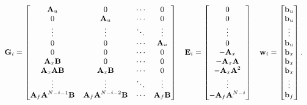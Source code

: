     \begin{equation}
    \begin{small}
        \begin{array}{rcl}
            \textbf{G}_i=\begin{bmatrix}
            \textbf{A}_u& 0& \cdots & 0\\
            0& \textbf{A}_u& \cdots & 0\\
            \vdots& \vdots& \ddots& \vdots\\
            0& 0& \cdots& \textbf{A}_u\\
            0& 0& \cdots& 0\\
            \textbf{A}_x\textbf{B}& 0& \cdots& 0\\
            \textbf{A}_x\textbf{A}\textbf{B}& \textbf{A}_x\textbf{B}& \cdots& 0\\
            \vdots& \vdots& \ddots& \vdots\\
            \textbf{A}_f\textbf{A}^{N-i-1}\textbf{B}& \textbf{A}_f\textbf{A}^{N-i-2}\textbf{B}& \cdots& \textbf{A}_f\textbf{B}\\
            \end{bmatrix}&
            \textbf{E}_i=\begin{bmatrix}
            0\\
            0\\
            \vdots\\
            0\\
            -\textbf{A}_x\\
            -\textbf{A}_x\textbf{A}\\
            -\textbf{A}_x\textbf{A}^2\\
            \vdots\\
            -\textbf{A}_f\textbf{A}^{N-i}\\
            \end{bmatrix}&
            \textbf{w}_i=\begin{bmatrix}
            \textbf{b}_u\\
            \textbf{b}_u\\
            \vdots\\
            \textbf{b}_u\\
            \textbf{b}_x\\
            \textbf{b}_x\\
            \textbf{b}_x\\
            \vdots\\
            \textbf{b}_f\\
            \end{bmatrix}.
        \end{array}
        \label{BASICMPC:equ:constrained_constraint_matrices}
        \end{small}
    \end{equation}

